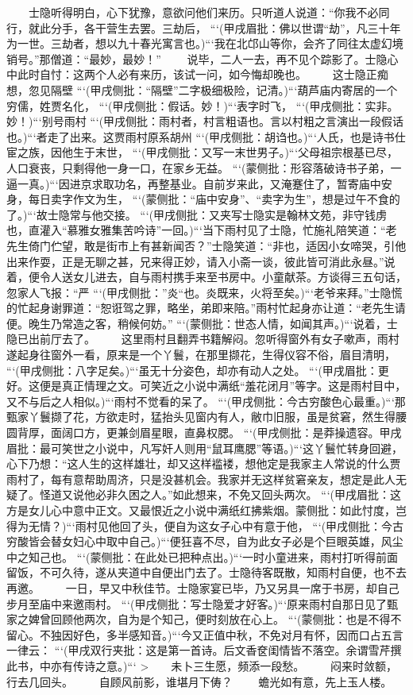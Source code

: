 \documentclass[
    ref = refDemo.bib,
    coverpage = cover.pdf,
    geometry = b5,
    lang = cn
]{spBook}
\begin{document}
    　　士隐听得明白，心下犹豫，意欲问他们来历。只听道人说道：“你我不必同行，就此分手，各干营生去罢。三劫后， ```(甲戌眉批：佛以世谓“劫”，凡三十年为一世。三劫者，想以九十春光寓言也。)```我在北邙山等你，会齐了同往太虚幻境销号。”那僧道：“最妙，最妙！”  
    　　说毕，二人一去，再不见个踪影了。士隐心中此时自忖：这两个人必有来历，该试一问，如今悔却晚也。  
    　　这士隐正痴想，忽见隔壁 ```(甲戌侧批：“隔壁”二字极细极险，记清。)```葫芦庙内寄居的一个穷儒，姓贾名化， ```(甲戌侧批：假话。妙！)```表字时飞， ```(甲戌侧批：实非。妙！)```别号雨村 ```(甲戌侧批：雨村者，村言粗语也。言以村粗之言演出一段假话也。)```者走了出来。这贾雨村原系胡州 ```(甲戌侧批：胡诌也。)```人氏，也是诗书仕宦之族，因他生于末世， ```(甲戌侧批：又写一末世男子。)```父母祖宗根基已尽，人口衰丧，只剩得他一身一口，在家乡无益。 ```(蒙侧批：形容落破诗书子弟，一逼一真。)```因进京求取功名，再整基业。自前岁来此，又淹蹇住了，暂寄庙中安身，每日卖字作文为生， ```(蒙侧批：“庙中安身”、“卖字为生”，想是过午不食的了。)```故士隐常与他交接。 ```(甲戌侧批：又夹写士隐实是翰林文苑，非守钱虏也，直灌入“慕雅女雅集苦吟诗”一回。)```当下雨村见了士隐，忙施礼陪笑道：“老先生倚门伫望，敢是街市上有甚新闻否？”士隐笑道：“非也，适因小女啼哭，引他出来作耍，正是无聊之甚，兄来得正妙，请入小斋一谈，彼此皆可消此永昼。”说着，便令人送女儿进去，自与雨村携手来至书房中。小童献茶。方谈得三五句话，忽家人飞报：“严 ```(甲戌侧批：”炎“也。炎既来，火将至矣。)```老爷来拜。”士隐慌的忙起身谢罪道：“恕诳驾之罪，略坐，弟即来陪。”雨村忙起身亦让道：“老先生请便。晚生乃常造之客，稍候何妨。” ```(蒙侧批：世态人情，如闻其声。)```说着，士隐已出前厅去了。  
    　　这里雨村且翻弄书籍解闷。忽听得窗外有女子嗽声，雨村遂起身往窗外一看，原来是一个丫鬟，在那里撷花，生得仪容不俗，眉目清明， ```(甲戌侧批：八字足矣。)```虽无十分姿色，却亦有动人之处。 ```(甲戌眉批：更好。这便是真正情理之文。可笑近之小说中满纸“羞花闭月”等字。这是雨村目中，又不与后之人相似。)```雨村不觉看的呆了。 ```(甲戌侧批：今古穷酸色心最重。)```那甄家丫鬟撷了花，方欲走时，猛抬头见窗内有人，敝巾旧服，虽是贫窘，然生得腰圆背厚，面阔口方，更兼剑眉星眼，直鼻权腮。 ```(甲戌侧批：是莽操遗容。甲戌眉批：最可笑世之小说中，凡写奸人则用“鼠耳鹰腮”等语。)```这丫鬟忙转身回避，心下乃想：“这人生的这样雄壮，却又这样褴褛，想他定是我家主人常说的什么贾雨村了，每有意帮助周济，只是没甚机会。我家并无这样贫窘亲友，想定是此人无疑了。怪道又说他必非久困之人。”如此想来，不免又回头两次。 ```(甲戌眉批：这方是女儿心中意中正文。又最恨近之小说中满纸红拂紫烟。蒙侧批：如此忖度，岂得为无情？)```雨村见他回了头，便自为这女子心中有意于他， ```(甲戌侧批：今古穷酸皆会替女妇心中取中自己。)```便狂喜不尽，自为此女子必是个巨眼英雄，风尘中之知己也。 ```(蒙侧批：在此处已把种点出。)```一时小童进来，雨村打听得前面留饭，不可久待，遂从夹道中自便出门去了。士隐待客既散，知雨村自便，也不去再邀。  
    　　一日，早又中秋佳节。士隐家宴已毕，乃又另具一席于书房，却自己步月至庙中来邀雨村。 ```(甲戌侧批：写士隐爱才好客。)```原来雨村自那日见了甄家之婢曾回顾他两次，自为是个知己，便时刻放在心上。 ```(蒙侧批：也是不得不留心。不独因好色，多半感知音。)```今又正值中秋，不免对月有怀，因而口占五言一律云： ```(甲戌双行夹批：这是第一首诗。后文香奁闺情皆不落空。余谓雪芹撰此书，中亦有传诗之意。)```  
    >　　未卜三生愿，频添一段愁。  
    　　闷来时敛额，行去几回头。  
    　　自顾风前影，谁堪月下俦？  
    　　蟾光如有意，先上玉人楼。  
\end{document}
